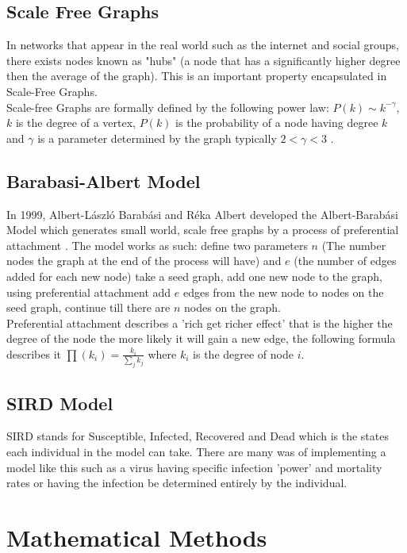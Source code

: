 \documentclass{article}
\begin{document}
        \subsection{Scale Free Graphs}
        In networks that appear in the real world such as the internet and social groups, there exists nodes known as "hubs" (a node that has a  significantly higher degree then the average of the graph). This is an important property encapsulated in Scale-Free Graphs.\\ 
        Scale-free Graphs are formally defined by the following power law: $P(k) \sim  k^{-\gamma }$, $k$ is the degree of a vertex, $P(k)$ is the probability of a node having degree $k$ and $\gamma$ is a parameter determined by the graph typically $2<\gamma<3$ \parencite{onnela2007structure}.

        \subsection{Barabasi-Albert Model}
        In 1999, Albert-László Barabási and Réka Albert developed the Albert-Barabási Model which generates small world, scale free graphs by a process of preferential attachment \parencite{barabasi1999emergence}. The model works as such: define two parameters $n$ (The number nodes the graph at the end of the process will have) and $e$ (the number of edges added for each new node) take a seed graph, add one new node to the graph, using preferential attachment add $e$ edges from the new node to nodes on the seed graph, continue till there are $n$ nodes on the graph.\\
        Preferential attachment describes a 'rich get richer effect' that is the higher the degree of the node the more likely it will gain a new edge, the following formula describes it $\prod (k_{i}) = \frac{k_{i}}{\sum_{j} {k_{j}}}$ where $k_{i}$ is the degree of node $i$. 
        \subsection{SIRD Model}
        SIRD stands for Susceptible, Infected, Recovered and Dead which is the states each individual in the model can take. There are many was of implementing a model like this such as a virus having specific infection 'power' and mortality rates or having the infection be determined entirely by the individual.
    \section{Mathematical Methods}
\end{document}
